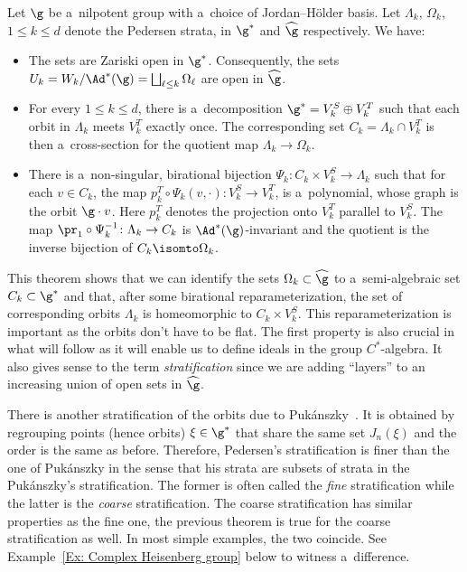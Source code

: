 \begin{thm}\label{Theorem:ClassicPedersecStrat}
 Let $\g$ be a~nilpotent group with a~choice of Jordan--H\"older basis. Let $\Lambda_k$, $\Omega_k$, $1\leq k \leq d$ denote the Pedersen strata, in $\g^*$ and $\widehat{\g}$ respectively. We have:
 \begin{itemize}
\itemsep=0pt
 \item The sets  are Zariski open in $\g^*$. Consequently, the sets $U_k = \smash{{W_k}/{\Ad^*(\g)}} = \smash{ \bigsqcup_{\ell\leq k}\Omega_{\ell}}$ are open in $\widehat{\g}$.
 \item For every $1\leq k \leq d$, there is a~decomposition $\g^* = V_k^S\oplus V_k^T$ such that each orbit in $\Lambda_k$ meets $V_k^T$ exactly once. The corresponding set $C_k = \Lambda_k \cap V_k^T$ is then a~cross-section for the quotient map $\Lambda_k \to \Omega_k$.
 \item There is a~non-singular, birational bijection $\Psi_k \colon C_k \times V_k^S \to \Lambda_k$ such that for each $v\in C_k$, the map $p_k^T \circ \Psi_k(v,\cdot) \colon V_k^S \to V_k^T$,
 is a~polynomial, whose graph is the orbit $\g \cdot v$. Here $p_k^T$ denotes the projection onto $V_k^T$ parallel to $V_k^S$. The map $\pr_1\circ \Psi_k^{-1} \colon \Lambda_k \to C_k$
 is $\Ad^*(\g)$-invariant and the quotient is the inverse bijection of $C_k \isomto \Omega_k$.
 \end{itemize}
\end{thm}

This theorem shows that we can identify the sets $\Omega_k\subset \widehat{\g}$ to a~semi-algebraic set ${C_k \subset \g^*}$ and that, after some birational reparameterization, the set of corresponding orbits $\Lambda_k$ is homeo\-morphic to $C_k \times V_k^S$. This reparameterization is important as the orbits don't have to be flat. The first property is also crucial in what will follow as it will enable us to define ideals in the group $C^*$-algebra. It also gives sense to the term \emph{stratification} since we are adding ``layers'' to an increasing union of open sets in $\widehat{\g}$.

\begin{rem}
 There is another stratification of the orbits due to Puk\'anszky~\cite{Pukanszky}. It is obtained by regrouping points (hence orbits) $\xi \in\g^*$ that share the same set $J_n(\xi)$ and the order is the same as before. Therefore, Pedersen's stratification is finer than the one of Puk\'anszky in the sense that his strata are subsets of strata in the Puk\'anszky's stratification. The former is often called the \emph{fine} stratification while the latter is the \emph{coarse} stratification. The coarse stratification has similar properties as the fine one, the previous theorem is true for the coarse stratification as well. In most simple examples, the two coincide. See Example~\ref{Ex: Complex Heisenberg group} below to witness a~difference.
\end{rem}

